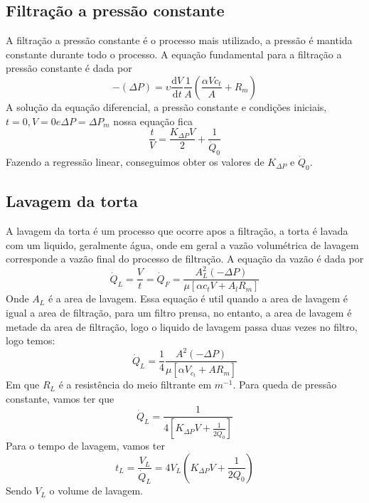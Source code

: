 \subsection{Filtração a pressão constante}
A filtração a pressão constante é o processo mais utilizado, a pressão é mantida constante durante
todo o processo. A equação fundamental para a filtração a pressão constante é dada por
\begin{equation}
    -(\Delta P) = \upsilon \frac{\mathrm{d}V}{\mathrm{d}t} \frac{1}{A}\left( \frac{\alpha Vc_{t} }{A} + R_{m}  \right)
\end{equation}
A solução da equação diferencial, a pressão constante e condições iniciais, \(t=0,V=0 e \Delta P =
\Delta P_m\) nossa equação fica
\begin{equation}
    \frac{t}{V} = \frac{K_{\Delta P}V}{2} + \frac{1}{\dot{Q}_0}
\end{equation}
Fazendo a regressão linear, conseguimos obter os valores de \(K_{\Delta P}\) e \(\dot{Q}_0\). \par
\subsection{Lavagem da torta}
A lavagem da torta é um processo que ocorre apos a filtração, a torta é lavada com um liquido,
geralmente água, onde em geral a vazão volumétrica de lavagem corresponde a vazão final do processo
de filtração. A equação da vazão é dada por
\begin{equation}
    \dot{Q}_L = \frac{V}{t} = \dot{Q}_{F} = \frac{A_{L} ^{2} (-\Delta P)}{\mu \left[ \alpha c_{t} V + A_{l} R_{m}  \right] } 
\end{equation} 
Onde \(A_{L}\) é a area de lavagem. Essa equação é util quando a area de lavagem é igual a area de
filtração, para um filtro prensa, no entanto, a area de lavagem é metade da area de filtração, logo
o liquido de lavagem passa duas vezes no filtro, logo temos:
\begin{equation}
    \dot{Q}_{L} = \frac{1}{4}\frac{A^{2} (-\Delta P)}{\mu \left[ \alpha V_{c_{t}} + AR_{m}   \right] }
\end{equation}
Em que \(R_{L} \) é a resistência do meio filtrante em \(m^{-1} \). Para queda de pressão constante,
vamos ter que
\begin{equation}
    \dot{Q}_{L} = \frac{1}{4 \left[ K_{\Delta P}V + \frac{1}{2 \dot{Q}_0}  \right] }
\end{equation}  
Para o tempo de lavagem, vamos ter
\begin{equation}
    t_{L} = \frac{V_{L}}{\dot{Q}_{L} }  =  4 V_{L} \left( K_{\Delta P}V + \frac{1}{2Q_0} \right) 
\end{equation}
Sendo \(V_{L} \) o volume de lavagem. \par